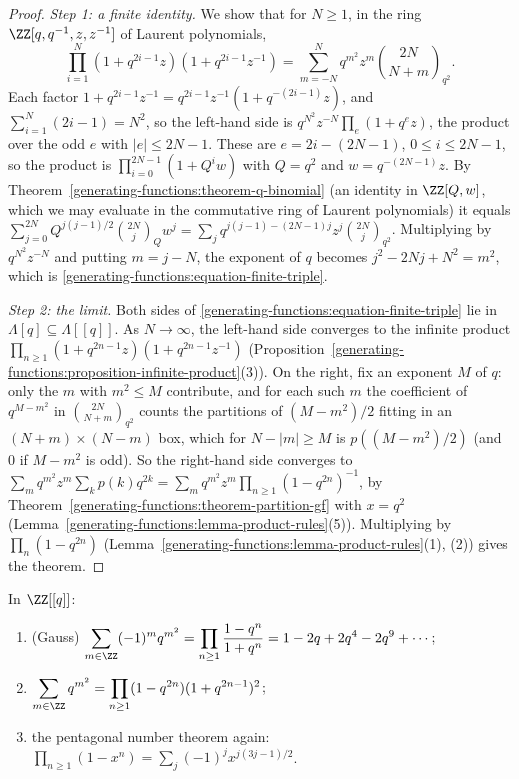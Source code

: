 \begin{proof}
\emph{Step 1: a finite identity.} We show that for $N \geq 1$, in the ring $\ZZ[q, q^{-1}, z, z^{-1}]$ of Laurent polynomials,
\begin{equation}\label{generating-functions:equation-finite-triple}
\prod_{i=1}^{N}(1 + q^{2i-1}z)(1 + q^{2i-1}z^{-1}) = \sum_{m=-N}^{N}q^{m^2}z^m\binom{2N}{N + m}_{q^2}.
\end{equation}
Each factor $1 + q^{2i-1}z^{-1} = q^{2i-1}z^{-1}(1 + q^{-(2i-1)}z)$, and $\sum_{i=1}^{N}(2i - 1) = N^2$, so the left-hand side is $q^{N^2}z^{-N}\prod_{e}(1 + q^ez)$, the product over the odd
$e$ with $|e| \leq 2N - 1$. These are $e = 2i - (2N - 1)$, $0 \leq i \leq 2N - 1$, so the product is $\prod_{i=0}^{2N-1}(1 + Q^iw)$ with $Q = q^2$ and $w = q^{-(2N-1)}z$. By
Theorem~\ref{generating-functions:theorem-q-binomial} (an identity in $\ZZ[Q, w]$, which we may evaluate in the commutative ring of Laurent polynomials) it equals
$\sum_{j=0}^{2N}Q^{j(j-1)/2}\binom{2N}{j}_Qw^j = \sum_jq^{j(j-1) - (2N-1)j}z^j\binom{2N}{j}_{q^2}$. Multiplying by $q^{N^2}z^{-N}$ and putting $m = j - N$, the exponent of $q$ becomes
$j^2 - 2Nj + N^2 = m^2$, which is \eqref{generating-functions:equation-finite-triple}.

\emph{Step 2: the limit.} Both sides of \eqref{generating-functions:equation-finite-triple} lie in $\Lambda[q] \subseteq \Lambda[[q]]$. As $N \to \infty$, the left-hand side converges to the
infinite product $\prod_{n \geq 1}(1 + q^{2n-1}z)(1 + q^{2n-1}z^{-1})$ (Proposition~\ref{generating-functions:proposition-infinite-product}(3)). On the right, fix an exponent $M$ of $q$: only the
$m$ with $m^2 \leq M$ contribute, and for each such $m$ the coefficient of $q^{M - m^2}$ in $\binom{2N}{N + m}_{q^2}$ counts the partitions of $(M - m^2)/2$ fitting in an $(N + m) \times (N - m)$
box, which for $N - |m| \geq M$ is $p((M - m^2)/2)$ (and $0$ if $M - m^2$ is odd). So the right-hand side converges to $\sum_mq^{m^2}z^m\sum_kp(k)q^{2k} = \sum_mq^{m^2}z^m\prod_{n \geq 1}(1 - q^{2n})^{-1}$,
by Theorem~\ref{generating-functions:theorem-partition-gf} with $x = q^2$ (Lemma~\ref{generating-functions:lemma-product-rules}(5)). Multiplying by $\prod_n(1 - q^{2n})$
(Lemma~\ref{generating-functions:lemma-product-rules}(1), (2)) gives the theorem.
\end{proof}

\begin{corollary}\label{generating-functions:corollary-triple-product}
In $\ZZ[[q]]$:
\begin{enumerate}
\item (Gauss) $\displaystyle\sum_{m \in \ZZ}(-1)^mq^{m^2} = \prod_{n \geq 1}\frac{1 - q^n}{1 + q^n} = 1 - 2q + 2q^4 - 2q^9 + \cdots$;
\item $\displaystyle\sum_{m \in \ZZ}q^{m^2} = \prod_{n \geq 1}(1 - q^{2n})(1 + q^{2n-1})^2$;
\item the pentagonal number theorem again: $\prod_{n \geq 1}(1 - x^n) = \sum_j(-1)^jx^{j(3j-1)/2}$.
\end{enumerate}
\end{corollary}

